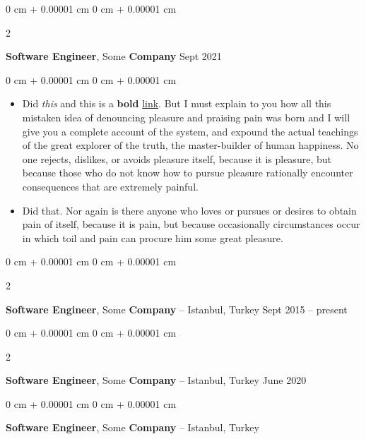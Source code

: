 \documentclass[10pt, letterpaper]{article}
\newenvironment{highlights}{
    \begin{itemize}[
        topsep=0.10 cm,
        parsep=0.10 cm,
        partopsep=0pt,
        itemsep=0pt,
        leftmargin=0 cm + 10pt
    ]
}{
    \end{itemize}
} %
\newenvironment{onecolentry}{
    \begin{adjustwidth}{
        0 cm + 0.00001 cm
    }{
        0 cm + 0.00001 cm
    }
}{
    \end{adjustwidth}
} %
\newenvironment{twocolentry}[2][]{
    \onecolentry
    \def\secondColumn{#2}
    \setcolumnwidth{\fill, 4.5 cm}
    \begin{paracol}{2}
}{
    \switchcolumn \raggedleft \secondColumn
    \end{paracol}
    \endonecolentry
} %
\begin{document}
        \begin{twocolentry}{
            Sept 2021
        }
            \textbf{Software Engineer}, Some \textbf{Company}\end{twocolentry}

        \vspace{0.10 cm}
        \begin{onecolentry}
            \begin{highlights}
                \item Did \textit{this} and this is a \textbf{bold} \href{https://example.com}{link}. But I must explain to you how all this mistaken idea of denouncing pleasure and praising pain was born and I will give you a complete account of the system, and expound the actual teachings of the great explorer of the truth, the master-builder of human happiness. No one rejects, dislikes, or avoids pleasure itself, because it is pleasure, but because those who do not know how to pursue pleasure rationally encounter consequences that are extremely painful.
                \item Did that. Nor again is there anyone who loves or pursues or desires to obtain pain of itself, because it is pain, but because occasionally circumstances occur in which toil and pain can procure him some great pleasure.
            \end{highlights}
        \end{onecolentry}


        \vspace{0.2 cm}

        \begin{twocolentry}{
            Sept 2015 – present
        }
            \textbf{Software Engineer}, Some \textbf{Company} -- Istanbul, Turkey\end{twocolentry}



        \vspace{0.2 cm}

        \begin{twocolentry}{
            June 2020
        }
            \textbf{Software Engineer}, Some \textbf{Company} -- Istanbul, Turkey\end{twocolentry}



        \vspace{0.2 cm}

        \begin{onecolentry}
            \textbf{Software Engineer}, Some \textbf{Company} -- Istanbul, Turkey\end{onecolentry}
\end{document}
